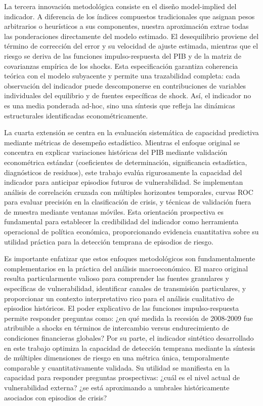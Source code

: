 \documentclass[3p,11pt,draft,natbib=false]{elsarticle}
\begin{document}
La tercera innovación metodológica consiste en el diseño model-implied del indicador. A diferencia de los índices compuestos tradicionales que asignan pesos arbitrarios o heurísticos a sus componentes, nuestra aproximación extrae todas las ponderaciones directamente del modelo estimado. El desequilibrio proviene del término de corrección del error y su velocidad de ajuste estimada, mientras que el riesgo se deriva de las funciones impulso-respuesta del PIB y de la matriz de covarianzas empírica de los shocks. Esta especificación garantiza coherencia teórica con el modelo subyacente y permite una trazabilidad completa: cada observación del indicador puede descomponerse en contribuciones de variables individuales del equilibrio y de fuentes específicas de shock. Así, el indicador no es una media ponderada ad-hoc, sino una síntesis que refleja las dinámicas estructurales identificadas econométricamente.

La cuarta extensión se centra en la evaluación sistemática de capacidad predictiva mediante métricas de desempeño estadístico. Mientras el enfoque original se concentra en explicar variaciones históricas del PIB mediante validación econométrica estándar (coeficientes de determinación, significancia estadística, diagnósticos de residuos), este trabajo evalúa rigurosamente la capacidad del indicador para anticipar episodios futuros de vulnerabilidad. Se implementan análisis de correlación cruzada con múltiples horizontes temporales, curvas ROC para evaluar precisión en la clasificación de crisis, y técnicas de validación fuera de muestra mediante ventanas móviles. Esta orientación prospectiva es fundamental para establecer la credibilidad del indicador como herramienta operacional de política económica, proporcionando evidencia cuantitativa sobre su utilidad práctica para la detección temprana de episodios de riesgo.

Es importante enfatizar que estos enfoques metodológicos son fundamentalmente complementarios en la práctica del análisis macroeconómico. El marco original resulta particularmente valioso para comprender las fuentes granulares y específicas de vulnerabilidad, identificar canales de transmisión particulares, y proporcionar un contexto interpretativo rico para el análisis cualitativo de episodios históricos. El poder explicativo de las funciones impulso-respuesta permite responder preguntas como: ¿en qué medida la recesión de 2008-2009 fue atribuible a shocks en términos de intercambio versus endurecimiento de condiciones financieras globales? Por su parte, el indicador sintético desarrollado en este trabajo optimiza la capacidad de detección temprana mediante la síntesis de múltiples dimensiones de riesgo en una métrica única, temporalmente comparable y cuantitativamente validada. Su utilidad se manifiesta en la capacidad para responder preguntas prospectivas: ¿cuál es el nivel actual de vulnerabilidad externa? ¿se está aproximando a umbrales históricamente asociados con episodios de crisis?
\end{document}
